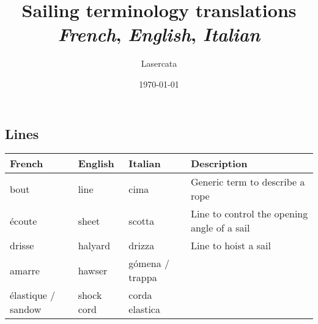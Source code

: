 \documentclass[a4paper, 12pt, twoside]{article}
\title{Sailing terminology translations \\ \textit{French}, \textit{English}, \textit{Italian}}
\author{Lasercata}
\date{\today}
\begin{document}
    
    \maketitle
    
    \tableofcontents
    \newpage
    
    \begin{indt}{\section{Lines}}%
        \begin{tabular}{|l|l|l||p{150pt}|}
            \hline %
            \textbf{French}
            & \textbf{English}
            & \textbf{Italian}
            & \textbf{Description}
            \\
            \hline
            \hline %
            bout %
            & line
            & cima
            & Generic term to describe a rope
            \\
            \hline %
            écoute %
            & sheet
            & scotta
            & Line to control the opening angle of a sail
            \\
            \hline %
            drisse %
            & halyard
            & drizza
            & Line to hoist a sail
            \\
            \hline %
            amarre %
            & hawser
            & gómena / trappa
            &
            \\
            \hline %
            élastique / sandow %
            & shock cord
            & corda elastica
            &
            \\
            \hline %
        \end{tabular}
    \end{indt}%
\end{document}
